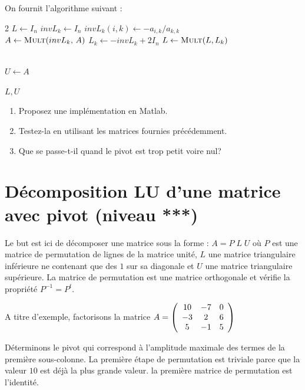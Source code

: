 \documentclass[a4paper, 10pt]{article}
\begin{document}
 
On fournit l'algorithme suivant :

\begin{algorithmic}[1]
   \begin{multicols}{2}
    \State $L \gets I_n $
        \State $invL_k \gets I_n$ 
                    \State $invL_k(i,k) \gets -a_{i,k}/a_{k,k} $
            \EndFor \\
        \State $A \gets \Call{Mult}{$$invL_k$, $A$$} $   
        \State $L_k \gets -invL_k + 2 I_n $
        \State $L \gets \Call{Mult}{$$L, L_k$$} $    

      \EndFor\\

      \State $U \gets A $

                               
    \State \Return $L, U$

\EndFunction
\end{multicols}
\end{algorithmic}

  \begin{enumerate} 
 \item Proposez une implémentation en Matlab.
 \item Testez-la en utilisant les matrices fournies précédemment.
 \item Que se passe-t-il quand le pivot est trop petit voire nul?
  \end{enumerate} 
   
\section{Décomposition LU d'une matrice avec pivot (niveau ***)}

Le but est ici de décomposer une matrice sous la forme : $A=P\; L\; U$
où $P$ est une matrice de permutation de lignes de la matrice unité,
$L$ une matrice triangulaire inférieure ne contenant que des $1$ sur sa diagonale et 
$U$ une matrice triangulaire supérieure.
La matrice de permutation est une matrice orthogonale et vérifie la propriété
$P^{-1}=P^t$.

A titre d'exemple, factorisons la matrice
 $A=\left(
\begin{array}{c c c}
10  & -7   &  0  \\
-3  &  2   & 6   \\
 5  &  -1  &  5  
\end{array}
\right)$

Déterminons le pivot qui correspond à l'amplitude maximale des termes
 de la première sous-colonne. La première étape de permutation est triviale 
 parce que la valeur $10$ est déjà la plus grande valeur. la première
 matrice de permutation est l'identité. 
 
\end{document}
